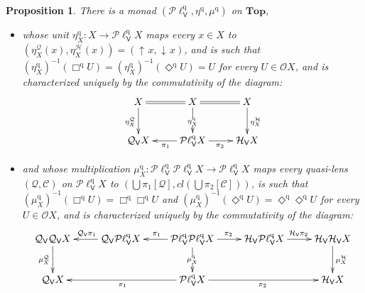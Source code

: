 \documentclass[preprint,12pt]{elsarticle}
\DeclareMathOperator{\upc}{\uparrow\!}
\DeclareMathOperator{\dc}{\downarrow\!}
\newcommand\Smyth{{\mathcal Q}}
\newcommand\Hoare{{\mathcal H}}
\newcommand\Vt{\mathsf{V}}
\newcommand\HV{\Hoare_\Vt}
\newcommand\SV{\Smyth_{\Vt}}
\newcommand\quasi{\mathrm{q}} %
\newcommand\QL{\Plotkin^\quasi}
\newcommand\QLV{\QL_\Vt}
\newcommand\Plotkin{\mathcal P\ell} %
\newcommand\Open{{\mathcal O}}
\newcommand\Topcat{\mathbf{Top}}
\newtheorem{proposition}[theorem]{Proposition}
\begin{document}
\begin{proposition}
  \label{prop:QLV:monad}
  There is a monad $(\QLV, \eta^\quasi, \mu^\quasi)$ on $\Topcat$,
  \begin{itemize}
  \item whose unit $\eta^\quasi_X \colon X \to \QLV X$ maps every
    $x \in X$ to
    $(\eta^\Smyth_X (x), \eta^\Hoare_X (x)) = (\upc x, \dc x)$, and is
    such that
    ${(\eta^\quasi_X)}^{-1} (\Box^\quasi U) = {(\eta^\quasi_X)}^{-1}
    (\Diamond^\quasi U) = U$ for every $U \in \Open X$, and is
    characterized uniquely by the commutativity of the diagram:
    \begin{equation}
      \label{eq:etaq}
      \xymatrix{
        X
        \ar[d]_{\eta^\Smyth_X}
        &
        X
        \ar@{=}[r]
        \ar[d]|{\eta^\quasi_X}
        \ar@{=}[l]
        &
        X
        \ar[d]^{\eta^\Hoare_X}
        \\
        \SV X
        &
        \QLV X
        \ar[l]^{\pi_1}
        \ar[r]_{\pi_2}
        &
        \HV X
      }
    \end{equation}
  \item and whose multiplication
    $\mu^\quasi_X \colon \QLV {\QLV X} \to \QLV X$ maps every
    quasi-lens $(\mathcal Q, \mathcal C)$ on $\QLV X$ to
    $(\bigcup \pi_1 [\mathcal Q], cl (\bigcup \pi_2 [\mathcal C]))$,
    is such that
    ${(\mu^\quasi_X)}^{-1} (\Box^\quasi U) = \Box^\quasi {\Box^\quasi
      U}$ and
    ${(\mu^\quasi_X)}^{-1} (\Diamond^\quasi U) = \Diamond^\quasi
    {\Diamond^\quasi U}$ for every $U \in \Open X$, and is
    characterized uniquely by the commutativity of the diagram:
    \begin{equation}
      \label{eq:muq}
      \xymatrix{
        \SV {\SV X}
        \ar[d]_{\mu^\Smyth_X}
        &
        \SV {\QLV X}
        \ar[l]_{\SV {\pi_1}}
        &
        \QLV {\QLV X}
        \ar[l]_{\pi_1}
        \ar[d]|{\mu^\quasi_X}
        \ar[r]^{\pi_2}
        &
        \HV {\QLV X}
        \ar[r]^{\HV {\pi_2}}
        &
        \HV {\HV X}
        \ar[d]^{\mu^\Hoare_X}
        \\
        \SV X
        &
        &
        \QLV X
        \ar[ll]^{\pi_1}
        \ar[rr]_{\pi_2}
        &
        &
        \HV X
      }
    \end{equation}
  \end{itemize}
\end{proposition}
\end{document}
